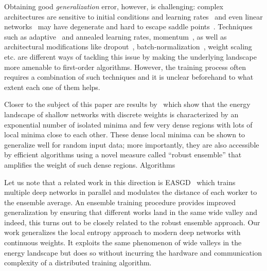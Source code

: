 \documentclass[10pt]{article}
\newcommand{\todo}[1]{{\color{gray}#1}\marginpar{\tiny\noindent{\raggedright{\color{blue}[TODO]}}}}
\begin{document}
Obtaining good \emph{generalization} error, however, is challenging: complex architectures are sensitive to initial conditions and learning rates~\citep{sutskever2013importance} and even linear networks~\citep{kawaguchi2016deep} may have degenerate and hard to escape saddle points~\citep{ge2015escaping,anandkumar2016efficient}. Techniques such as adaptive~\citep{duchi2011adaptive} and annealed learning rates, momentum~\citep{tieleman2012lecture}, as well as architectural modifications like dropout~\citep{srivastava2014dropout}, batch-normalization~\citep{ioffe2015batch,cooijmans2016recurrent}, weight scaling~\citep{salimans2016weight} etc. are different ways of tackling this issue by making the underlying landscape more amenable to first-order algorithms. However, the training process often requires a combination of such techniques and it is unclear beforehand to what extent each one of them helps.

\todo{Closer to the subject of this paper are results by~\citet{baldassi2015subdominant,baldassi2016unreasonable,baldassi2016multilevel} which show that the energy landscape of shallow networks with discrete weights is characterized by an exponential number of isolated minima and few very dense regions with lots of local minima close to each other. These dense local minima can be shown to generalize well for random input data; more importantly, they are also accessible by efficient algorithms using a novel measure called ``robust ensemble'' that amplifies the weight of such dense regions. Algorithms 

Let us note that a related work in this direction is EASGD~\citep{zhang2015deep} which trains multiple deep networks in parallel and modulates the distance of each worker to the ensemble average. An ensemble training procedure provides improved generalization by ensuring that different works land in the same wide valley and indeed, this turns out to be closely related to the robust ensemble approach.
%
Our work generalizes the local entropy approach to modern deep networks with continuous weights. It exploits the same phenomenon of wide valleys in the energy landscape but does so without incurring the hardware and communication complexity of a distributed training algorithm.}
\end{document}
